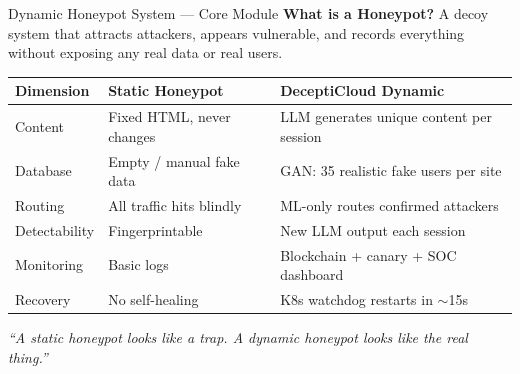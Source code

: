 \documentclass[aspectratio=169,12pt]{beamer}
\begin{document}
\begin{frame}{Dynamic Honeypot System --- Core Module}
  \textbf{\textcolor{dcCyan}{What is a Honeypot?}}
  A decoy system that attracts attackers, appears vulnerable, and records everything
  without exposing any real data or real users.

  \vspace{0.3em}
  \centering\footnotesize
  \begin{tabular}{@{} p{2.3cm} p{3.0cm} p{5.0cm} @{}}
    \toprule
    \rowcolor{dcMid}
    \textcolor{dcCyan}{Dimension} &
    \textcolor{dcRed}{Static Honeypot} &
    \textcolor{dcGreen}{DeceptiCloud Dynamic}\\
    \midrule
    Content       & Fixed HTML, never changes     & LLM generates unique content per session\\
    \rowcolor{dcDark}
    Database      & Empty / manual fake data      & GAN: 35 realistic fake users per site\\
    Routing       & All traffic hits blindly      & ML-only routes confirmed attackers\\
    \rowcolor{dcDark}
    Detectability & Fingerprintable               & New LLM output each session\\
    Monitoring    & Basic logs                    & Blockchain + canary + SOC dashboard\\
    \rowcolor{dcDark}
    Recovery      & No self-healing               & K8s watchdog restarts in $\sim$15s\\
    \bottomrule
  \end{tabular}

  \vspace{0.4em}
  \begin{block}{}
    \centering\small\textit{``A static honeypot looks like a trap.
    A dynamic honeypot looks like the real thing.''}
  \end{block}
\end{frame}
\end{document}
